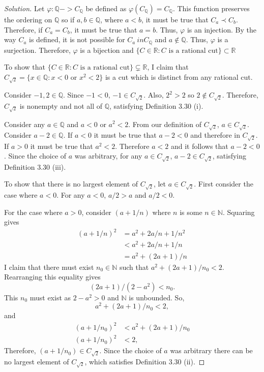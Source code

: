 \documentclass{amsart}
\newcommand{\N}{\mathbb N}
\newcommand{\Q}{\mathbb Q}
\newcommand{\R}{\mathbb R}
\newcommand{\1}{\mathds{1}}
\def \R {{\mathbb {R}}}
\def \N {{\mathbb {N}}}
\def \phi {{\varphi}}
\numberwithin{equation}{section}
\numberwithin{theorem}{section}
\begin{document}
\begin{proof}[Solution]
	
	Let $\phi:\Q -> C_{\Q}$ be defined as $\phi(C_{\Q}) = C_{\Q}$. This function preserves the ordering on $\Q$ so if $a,b\in \Q$, where $a<b$, it must be true that $C_a\prec C_b$. Therefore, if $C_a = C_b$, it must be true that $a = b$. Thus, $\phi$ is an injection. By the way $C_a$ is defined, it is not possible for $C_a \ in C_{\Q}$ and $a\notin \Q$. Thus, $\phi$ is a surjection. Therefore, $\phi$ is a bijection and $\{C\in\R: C \text{ is a rational cut}\}\subset \R$
	
	To show that $\{C\in\R: C \text{ is a rational cut}\}\subsetneq \R$, I claim that $C_{\sqrt{2}} = \{x\in\Q: x<0 \text{ or } x^2<2\}$ is a cut which is distinct from any rational cut.
	
	Consider $-1,2\in\Q$. Since $-1<0$, $-1\in C_{\sqrt{2}}$. Also, $2^2 > 2$ so $2\notin C_{\sqrt{2}}$. Therefore, $C_{\sqrt{2}}$ is nonempty and not all of $\Q$, satisfying Definition 3.30 (i).
	
	Consider any $a\in\Q$ and $a<0$ or $a^2<2$. From our definition of $C_{\sqrt{2}}$, $a\in C_{\sqrt{2}}$. Consider $a-2\in \Q$. If $a<0$ it must be true that $a-2<0$ and therefore in $C_{\sqrt{2}}$. If $a>0$ it must be true that $a^2 < 2$. Therefore $a<2$ and it follows that $a-2<0$. Since the choice of $a$ was arbitrary, for any $a\in C_{\sqrt{2}}$, $a-2 \in C_{\sqrt{2}}$, satisfying Definition 3.30 (iii).
	
	To show that there is no largest element of $C_{\sqrt{2}}$, let $a\in C_{\sqrt{2}}$. First consider the case where $a<0$. For any $a<0$, $a/2 > a$ and $a/2 < 0$.
	
	For the case where $a>0$, consider $(a+1/n)$ where $n$ is some $n\in\N$. Squaring gives
	\[\begin{split}
		(a+1/n)^2 &= a^2 + 2a/n + 1/n^2\\
				&<a^2 + 2a/n + 1/n\\
				&=a^2 + (2a+1)/n
	\end{split}\]
	I claim that there must exist $n_0\in\N$ such that $a^2 + (2a+1)/n_0 < 2$. Rearranging this equality gives $$(2a+1)/(2-a^2) < n_0.$$ This $n_0$ must exist as $2-a^2 > 0$ and $\N$ is unbounded. So, $$a^2 + (2a+1)/n_0 < 2,$$ and 
	\[\begin{split}
		(a+1/n_0)^2 &< a^2 + (2a+1)/n_0\\
		(a+1/n_0)^2 &< 2,
	\end{split}\]
	Therefore, $(a+1/n_0) \in C_{\sqrt{2}}$. Since the choice of $a$ was arbitrary there can be no largest element of $C_{\sqrt{2}}$, which satisfies Definition 3.30 (ii). 
	

\end{proof}
\end{document}
